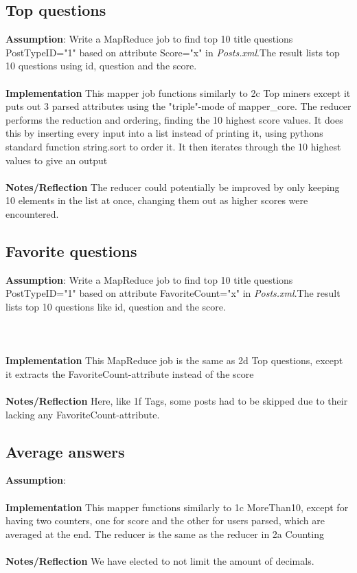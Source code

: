 \documentclass[fleqn,10pt]{wlscirep}
\begin{document}
\subsection{Top questions}
\textbf{Assumption}: Write a MapReduce job to find top 10 title questions PostTypeID="1"  based on attribute Score="x" in \textit{Posts.xml}.The result lists top 10 questions using id, question and the score.\\ \\
\textbf{Implementation} This mapper job functions similarly to 2c Top miners except it puts out 3 parsed attributes using the "triple"-mode of mapper\_core. The reducer performs the reduction and ordering, finding the 10 highest score values. It does this by inserting every input into a list instead of printing it, using pythons standard function string.sort to order it. It then iterates through the 10 highest values to give an output \\ \\
\textbf{Notes/Reflection} The reducer could potentially be improved by only keeping 10 elements in the list at once, changing them out as higher scores were encountered.


\subsection{Favorite questions }
\textbf{Assumption}: Write a MapReduce job to find top 10 title questions PostTypeID="1"  based on attribute FavoriteCount="x" in \textit{Posts.xml}.The result lists top 10 questions like id, question and the score.\\ \\ \\ \\
\textbf{Implementation} This MapReduce job is the same as 2d Top questions, except it extracts the FavoriteCount-attribute instead of the score \\ \\
\textbf{Notes/Reflection} Here, like 1f Tags, some posts had to be skipped due to their lacking any FavoriteCount-attribute.


\subsection{Average answers}
\textbf{Assumption}: \\ \\
\textbf{Implementation} This mapper functions similarly to  1c MoreThan10, except for having two counters, one for score and the other for users parsed, which are averaged at the end. The reducer is the same as the reducer in 2a Counting \\ \\
\textbf{Notes/Reflection} We have elected to not limit the amount of decimals.

\end{document}

